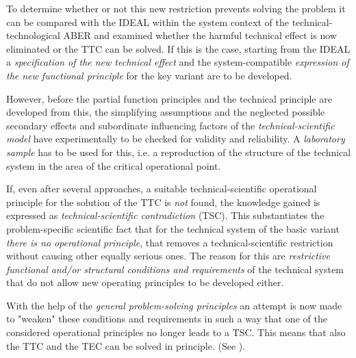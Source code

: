\documentclass[11pt,a4paper]{article}
\begin{document}
To determine whether or not this new restriction prevents solving the problem
it can be compared with the IDEAL within the system context of the
technical-technological ABER and examined whether the harmful technical effect
is now eliminated or the TTC can be solved.  If this is the case, starting
from the IDEAL a \emph{specification of the new technical effect} and the
system-compatible \emph{expression of the new functional principle} for the
key variant are to be developed.

However, before the partial function principles and the technical principle
are developed from this, the simplifying assumptions and the neglected
possible secondary effects and subordinate influencing factors of the
\emph{technical-scientific model} have experimentally to be checked for
validity and reliability.  A \emph{laboratory sample} has to be used for this,
i.e. a reproduction of the structure of the technical system in the area of
the critical operational point.

If, even after several approaches, a suitable technical-scientific operational
principle for the solution of the TTC is \emph{not} found, the knowledge
gained is expressed as \emph{technical-scientific contradiction} (TSC). This
substantiates the problem-specific scientific fact that for the technical
system of the basic variant \emph{there is no operational principle}, that
removes a technical-scientific restriction without causing other equally
serious ones.  The reason for this are \emph{restrictive functional and/or
  structural conditions and requirements} of the technical system that do not
allow new operating principles to be developed either.

With the help of the \emph{general problem-solving principles} an attempt is
now made to "weaken" these conditions and requirements in such a way that one
of the considered operational principles no longer leads to a TSC.  This means
that also the TTC and the TEC can be solved in principle. (See
\cite[A.9]{RM-21}).
\end{document}
